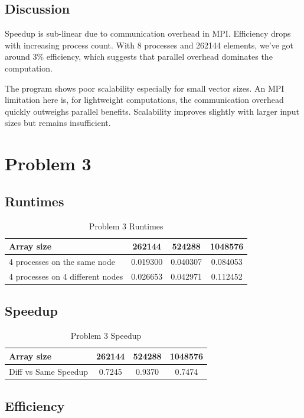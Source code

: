 \documentclass[11pt]{article}
\begin{document}
\subsection{Discussion}
\label{sec:orgbab6b84}

Speedup is sub-linear due to communication overhead in MPI. Efficiency drops with increasing process count. With 8 processes and 262144 elements, we've got around 3\% efficiency, which suggests that parallel overhead dominates the computation.

The program shows poor scalability especially for small vector sizes. An MPI limitation here is, for lightweight computations, the communication overhead quickly outweighs parallel benefits. Scalability improves slightly with larger input sizes but remains insufficient.
\newpage
\section{Problem 3}
\label{sec:org07b8267}
\subsection{Runtimes}
\label{sec:org5508f65}

\begin{table}[htbp]
\caption{Problem 3 Runtimes}
\centering
\begin{tabular}{|l|c|c|c|}
\hline
Array size & 262144 & 524288 & 1048576\\
\hline
4 processes on the same node & 0.019300 & 0.040307 & 0.084053\\
\hline
4 processes on 4 different nodes & 0.026653 & 0.042971 & 0.112452\\
\hline
\end{tabular}
\end{table}
\subsection{Speedup}
\label{sec:org87b4e3b}

\begin{table}[htbp]
\caption{Problem 3 Speedup}
\centering
\begin{tabular}{|l|c|c|c|}
\hline
Array size & 262144 & 524288 & 1048576\\
\hline
Diff vs Same Speedup & 0.7245 & 0.9370 & 0.7474\\
\hline
\end{tabular}
\end{table}
\subsection{Efficiency}
\label{sec:org449faab}
\end{document}
